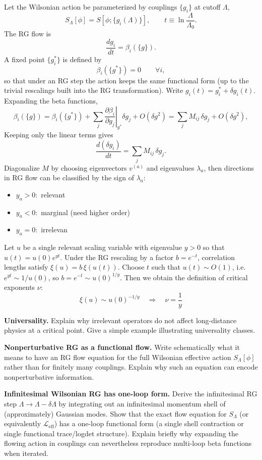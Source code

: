 \begin{solution}[29.4]
	Let the Wilsonian action be parameterized by couplings $\{g_i\}$ at cutoff $\Lambda$,
	\[
	S_\Lambda[\phi]=S[\phi;\{g_i(\Lambda)\}],\qquad t\equiv \ln\frac{\Lambda}{\Lambda_0}.
	\]
	The RG flow is
	\[
	\frac{d g_i}{dt}=\beta_i(\{g\}).
	\]
	A fixed point $\{g_i^\ast\}$ is defined by
	\[
	\boxed{
	\beta_i(\{g^\ast\})=0\qquad \forall i},
	\]
	so that under an RG step the action keeps the same functional form (up to the trivial rescalings built into the RG transformation). Write $g_i(t)=g_i^\ast+\delta g_i(t)$. Expanding the beta functions,
	\[
	\beta_i(\{g\})=\beta_i(\{g^\ast\})+\sum_j\left.\frac{\partial\beta_i}{\partial g_j}\right|_{g^\ast}\delta g_j+O(\delta g^2)
	=\sum_j M_{ij}\,\delta g_j+O(\delta g^2),
	\]
	Keeping only the linear terms gives
	\[
	\frac{d(\delta g_i)}{dt}=\sum_j M_{ij}\,\delta g_j.
	\]
	Diagonalize $M$ by choosing eigenvectors $v^{(a)}$ and eigenvalues $\lambda_a$, then directions in RG flow can be classified by the sign of $\lambda_a$:
	\begin{itemize}
		\item $y_a>0:$ relevant
		\item $y_a<0:$ marginal (need higher order)
		\item $y_a=0:$ irrelevan
	\end{itemize}
	
	Let $u$ be a single relevant scaling variable with eigenvalue $y>0$ so that $u(t)=u(0)e^{y t}$.
	Under the RG rescaling by a factor $b=e^{-t}$, correlation lengths satisfy $\xi(u)=b\,\xi(u(t))$.
	Choose $t$ such that $u(t)\sim O(1)$, i.e.\ $e^{y t}\sim 1/u(0)$, so $b=e^{-t}\sim u(0)^{1/y}$.
	Then we obtain the definition of critical exponents $\nu$:
	\[
	\xi(u)\sim u(0)^{-1/y}
	\quad\Longrightarrow\quad
	\boxed{\nu=\frac{1}{y}}
	\]
\end{solution}
\begin{problem}
    \textbf{Universality.} Explain why irrelevant operators do not affect long-distance physics at a critical point. Give a simple example illustrating universality classes.
\end{problem}
\begin{problem}
    \textbf{Nonperturbative RG as a functional flow.} Write schematically what it means to have an RG flow equation for the full Wilsonian effective action \(S_\Lambda[\phi]\) rather than for finitely many couplings. Explain why such an equation can encode nonperturbative information.
\end{problem}
\begin{problem}
        \textbf{Infinitesimal Wilsonian RG has one-loop form.} Derive the infinitesimal RG step \(\Lambda\to\Lambda-\delta\Lambda\) by integrating out an infinitesimal momentum shell of (approximately) Gaussian modes. Show that the exact flow equation for \(S_\Lambda\) (or equivalently \(\mathcal{L}_{\text{eff}}\)) has a one-loop functional form (a single shell contraction or single functional trace/logdet structure). Explain briefly why expanding the flowing action in couplings can nevertheless reproduce multi-loop beta functions when iterated.
    \end{problem}

